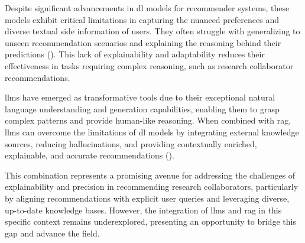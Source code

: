 Despite significant advancements in \gls{dl} models for recommender systems, these models exhibit critical limitations in capturing the nuanced preferences and diverse textual side information of users.
They often struggle with generalizing to unseen recommendation scenarios and explaining the reasoning behind their predictions (\cite{Zhao2024}).
This lack of explainability and adaptability reduces their effectiveness in tasks requiring complex reasoning, such as research collaborator recommendations.

\glspl{llm} have emerged as transformative tools due to their exceptional natural language understanding and generation capabilities, enabling them to grasp complex patterns and provide human-like reasoning.
When combined with \gls{rag}, \glspl{llm} can overcome the limitations of \gls{dl} models by integrating external knowledge sources, reducing hallucinations, and providing contextually enriched, explainable, and accurate recommendations (\cite{Deldjoo2024}).

This combination represents a promising avenue for addressing the challenges of explainability and precision in recommending research collaborators, particularly by aligning recommendations with explicit user queries and leveraging diverse, up-to-date knowledge bases.
However, the integration of \glspl{llm} and \gls{rag} in this specific context remains underexplored, presenting an opportunity to bridge this gap and advance the field.